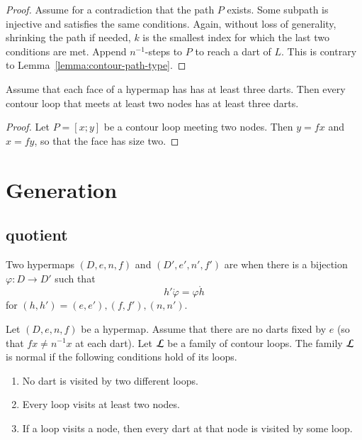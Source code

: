 
\begin{proof} Assume for a contradiction that the path $P$ exists.
Some subpath is injective and satisfies the same conditions.  Again,
without loss of generality, shrinking the path if needed, $k$ is the
smallest index for which the last two conditions are met.  Append
$n^{-1}$-steps to $P$ to reach a dart of $L$.  This is contrary to
Lemma~\ref{lemma:contour-path-type}.
\end{proof}

\begin{lemma}\label{lemma:3dart}  
Assume that each face of a hypermap has has at least three darts.
Then every contour loop that meets at least two nodes has at least
three darts.
\end{lemma}

\begin{proof} Let $P=[x;y]$ be a contour loop meeting two nodes.  Then
$y = f x$ and $x = f y$, so that the face has size two.
\end{proof}

\section{Generation}
%

\subsection{quotient}
%

\begin{definition}[isomorphic] Two hypermaps $(D,e,n,f)$ and
$(D',e',n',f')$ are  when there is a bijection
$\varphi:D\to D'$ such that
\begin{displaymath}h'\ocirc \varphi = \varphi\ocirc h\end{displaymath}
for $(h,h')=(e,e'), (f,f'), (n,n')$.
%
%
\end{definition}


\begin{definition}
Let $(D,e,n,f)$ be a hypermap. Assume that 
there are no darts fixed by $e$ 
(so that $f x \ne n^{-1} x$ at each dart). 
Let $\cal L$ be a family of contour
loops.  The family $\cal L$ is  normal if the following
conditions hold of its loops. \begin{enumerate}
\item  No dart is visited by two different loops.
\item  Every loop visits at least two nodes.
\item  If a loop visits a node, then every dart at that node is visited
by some loop.
\end{enumerate}
%
\end{definition}

